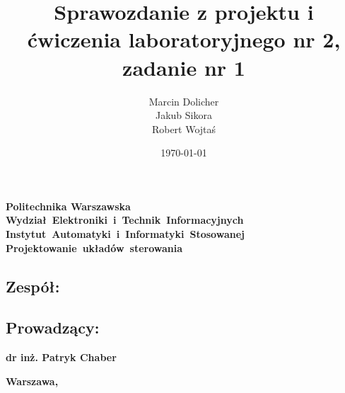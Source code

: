 \documentclass{mwrep}
\title{\bf Sprawozdanie z projektu i ćwiczenia laboratoryjnego nr 2, zadanie nr 1 \vskip 0.1cm}
\author{Marcin Dolicher \\ Jakub Sikora \\ Robert Wojtaś}
\date{\today}
\begin{document}
\frenchspacing
\pagestyle{uheadings}

\makeatletter
\renewcommand{\maketitle}{\begin{titlepage}
		\begin{center}{
				\LARGE {\bf Politechnika Warszawska}}\\
            \vspace{0.4cm}
            \leftskip-0.9cm
            {\LARGE {\bf \mbox{Wydział Elektroniki i Technik Informacyjnych}}}\\
            \vspace{0.2cm}
            {\LARGE {\bf \mbox{Instytut Automatyki i Informatyki Stosowanej}}}\\
            
            \vspace{5cm}
            \leftskip-1.3cm
			{\bf \Huge \mbox{Projektowanie układów sterowania} \vskip 0.1cm}
		\end{center}
		\vspace{0.1cm}

		\begin{center}
			{\bf \LARGE \@title}
		\end{center}

		\vspace{9cm}
		\begin{paracol}{2}
			\addtocontents{toc}{\protect\setcounter{tocdepth}{1}}
			\subsection*{Zespół:}
			\bf{ \Large{ \noindent\@author \par}}
			\addtocontents{toc}{\protect\setcounter{tocdepth}{2}}

			\switchcolumn \addtocontents{toc}{\protect\setcounter{tocdepth}{1}}
			\subsection*{Prowadzący:}
			\bf{\Large{\noindent dr inż. Patryk Chaber}}
			\addtocontents{toc}{\protect\setcounter{tocdepth}{2}}

		\end{paracol}
		\vspace*{\stretch{6}}
		\begin{center}
			\bf{\large{Warszawa, \@date\vskip 0.1cm}}
		\end{center}
	\end{titlepage}
}
\makeatother
\maketitle
\tableofcontents
\end{document}

